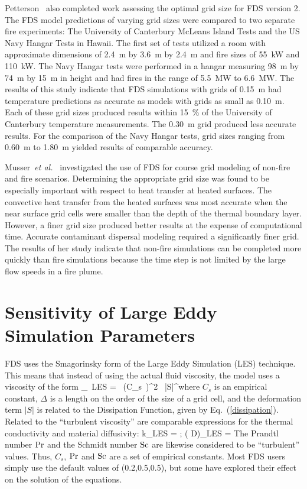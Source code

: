 \documentclass[11pt]{book}
\begin{document}
Petterson~\cite{Petterson:1} also completed work assessing the optimal
grid size for FDS version 2. The FDS model predictions of varying grid
sizes were  compared to two separate fire  experiments: The University
of Canterbury  McLeans Island  Tests and the  US Navy Hangar  Tests in
Hawaii.  The first  set  of  tests utilized  a  room with  approximate
dimensions of  2.4~m by  3.6~m by  2.4~m and fire  sizes of  55~kW and
110~kW. The  Navy Hangar  tests were performed  in a  hangar measuring
98~m by 74~m by 15~m in height and had fires in the range of 5.5~MW to
6.6~MW. The results  of this study indicate that  FDS simulations with
grids of 0.15~m had temperature predictions as accurate as models with
grids as  small as 0.10~m. Each  of these grid  sizes produced results
within   15~\%   of   the   University   of   Canterbury   temperature
measurements. The 0.30~m grid  produced less accurate results. For the
comparison of the Navy Hangar tests, grid sizes ranging from 0.60~m to
1.80~m yielded results of comparable accuracy.

Musser~{\em et  al.}~\cite{Musser:1} investigated  the use of  FDS for
course grid  modeling of non-fire and fire  scenarios. Determining the
appropriate  grid  size was  found  to  be  especially important  with
respect  to heat  transfer  at heated  surfaces.  The convective  heat
transfer  from the  heated surfaces  was most  accurate when  the near
surface grid cells were smaller than the depth of the thermal boundary
layer.  However, a  finer grid  size  produced better  results at  the
expense of computational time. Accurate contaminant dispersal modeling
required a significantly finer grid. The results of her study indicate
that  non-fire simulations  can be  completed more  quickly  than fire
simulations because  the time  step is not  limited by the  large flow
speeds in a fire plume.


\section{Sensitivity of Large Eddy Simulation Parameters}

FDS  uses the  Smagorinsky form  of  the Large  Eddy Simulation  (LES)
technique.  This  means  that   instead  of  using  the  actual  fluid
viscosity, the model uses a viscosity of the form \be \mu_{\hbox{\tiny
LES}} =  \rho \,  (C_s\, \Delta)^2  \, |S|^\ha \ee  where $C_s$  is an
empirical constant, $\Delta$ is a length on the order of the size of a
grid  cell,  and  the  deformation   term  $|S|$  is  related  to  the
Dissipation Function, given by Eq.~(\ref{dissipation}). Related to the
``turbulent  viscosity'' are  comparable expressions  for  the thermal
conductivity  and  material diffusivity:  \be  k_{\hbox{\tiny LES}}  =
  \quad   ;  \quad  (\rho
D)_{\hbox{\tiny  LES}}  =  \ee  The
Prandtl  number  $\hbox{Pr}$  and  the  Schmidt number  $\hbox{Sc}$  are  likewise
considered to  be ``turbulent'' values.  Thus, $C_s$, $\hbox{Pr}$  and $\hbox{Sc}$
are  a set  of  empirical constants.  Most  FDS users  simply use  the
default values  of (0.2,0.5,0.5), but some have  explored their effect
on the solution of the equations.
\end{document}
